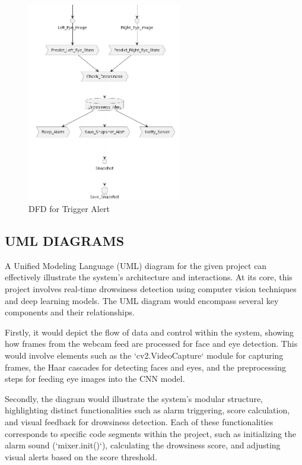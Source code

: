 \documentclass[12pt]{article}
\begin{document}
\FloatBarrier
\begin{figure}[h]
\centering
\includegraphics[width=0.6\textwidth]{dfd2}
\caption{DFD for Trigger Alert}
\end{figure}
\FloatBarrier
\subsection{UML DIAGRAMS }

A Unified Modeling Language (UML) diagram for the given project can effectively illustrate the system's architecture and interactions. At its core, this project involves real-time drowsiness detection using computer vision techniques and deep learning models. The UML diagram would encompass several key components and their relationships. 

Firstly, it would depict the flow of data and control within the system, showing how frames from the webcam feed are processed for face and eye detection. This would involve elements such as the `cv2.VideoCapture` module for capturing frames, the Haar cascades for detecting faces and eyes, and the preprocessing steps for feeding eye images into the CNN model.

Secondly, the diagram would illustrate the system's modular structure, highlighting distinct functionalities such as alarm triggering, score calculation, and visual feedback for drowsiness detection. Each of these functionalities corresponds to specific code segments within the project, such as initializing the alarm sound (`mixer.init()`), calculating the drowsiness score, and adjusting visual alerts based on the score threshold.
\end{document}
